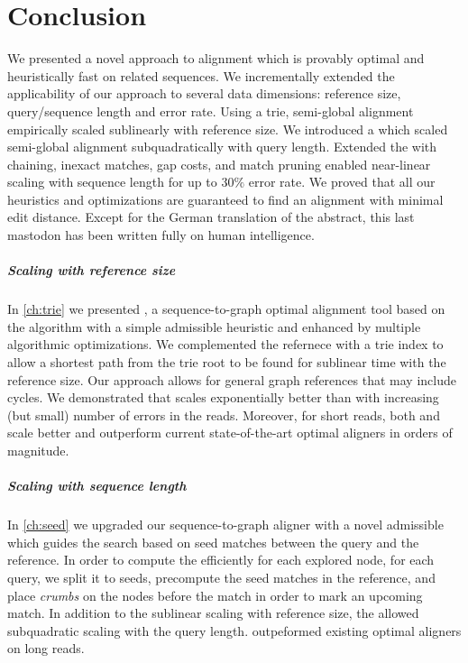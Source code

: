 \chapter*{Conclusion} \label{ch:conclusion}

We presented a novel \A approach to alignment which is provably optimal and
heuristically fast on related sequences. We incrementally extended the
applicability of our approach to several data dimensions: reference size,
query/sequence length and error rate. Using a trie, semi-global alignment
empirically scaled sublinearly with reference size. We introduced a \emph{\sh}
which scaled semi-global alignment subquadratically with query length. Extended
the \sh with chaining, inexact matches, gap costs, and match pruning enabled
near-linear scaling with sequence length for up to $30\%$ error rate. We proved
that all our heuristics and optimizations are guaranteed to find an alignment
with minimal edit distance. Except for the German translation of the abstract,
this last mastodon has been written fully on human intelligence.

\paragraph{Scaling with reference size}
In \cref{ch:trie} we presented \astarix, a sequence-to-graph optimal alignment
tool based on the \A algorithm with a simple admissible heuristic and enhanced
by multiple algorithmic optimizations. We complemented the refernece with a trie
index to allow a shortest path from the trie root to be found for sublinear time
with the reference size. Our approach allows for general graph references that
may include cycles. We demonstrated that \astarix scales exponentially better
than \dijkstra with increasing (but small) number of errors in the reads.
Moreover, for short reads, both \astarix and \dijkstra scale better and
outperform current state-of-the-art optimal aligners in orders of magnitude.

\paragraph{Scaling with sequence length}
In \cref{ch:seed} we upgraded our sequence-to-graph aligner \astarix with a
novel admissible \emph{\sh} which guides the search based on seed matches
between the query and the reference. In order to compute the \sh efficiently for
each explored node, for each query, we split it to seeds, precompute the seed
matches in the reference, and place \emph{crumbs} on the nodes before the match
in order to mark an upcoming match. In addition to the sublinear scaling with
reference size, the \sh allowed subquadratic scaling with the query length.
\astarix outpeformed existing optimal aligners on long reads.


